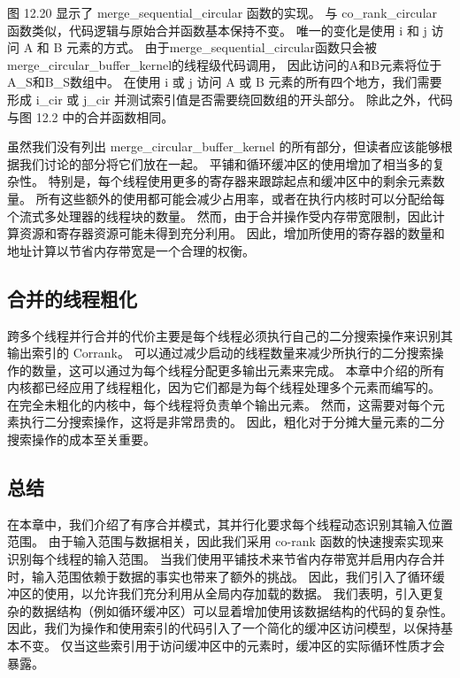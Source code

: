 图 12.20 显示了 merge\_sequential\_circular 函数的实现。 
与 co\_rank\_circular 函数类似，代码逻辑与原始合并函数基本保持不变。 
唯一的变化是使用 i 和 j 访问 A 和 B 元素的方式。 
由于merge\_sequential\_circular函数只会被merge\_circular\_buffer\_kernel的线程级代码调用，
因此访问的A和B元素将位于A\_S和B\_S数组中。 
在使用 i 或 j 访问 A 或 B 元素的所有四个地方，我们需要形成 i\_cir 或 j\_cir 并测试索引值是否需要绕回数组的开头部分。 
除此之外，代码与图 12.2 中的合并函数相同。

虽然我们没有列出 merge\_circular\_buffer\_kernel 的所有部分，但读者应该能够根据我们讨论的部分将它们放在一起。 
平铺和循环缓冲区的使用增加了相当多的复杂性。 特别是，每个线程使用更多的寄存器来跟踪起点和缓冲区中的剩余元素数量。 
所有这些额外的使用都可能会减少占用率，或者在执行内核时可以分配给每个流式多处理器的线程块的数量。 
然而，由于合并操作受内存带宽限制，因此计算资源和寄存器资源可能未得到充分利用。 
因此，增加所使用的寄存器的数量和地址计算以节省内存带宽是一个合理的权衡。

\subsection{合并的线程粗化}
跨多个线程并行合并的代价主要是每个线程必须执行自己的二分搜索操作来识别其输出索引的 Corrank。 
可以通过减少启动的线程数量来减少所执行的二分搜索操作的数量，这可以通过为每个线程分配更多输出元素来完成。 
本章中介绍的所有内核都已经应用了线程粗化，因为它们都是为每个线程处理多个元素而编写的。 
在完全未粗化的内核中，每个线程将负责单个输出元素。 然而，这需要对每个元素执行二分搜索操作，这将是非常昂贵的。 
因此，粗化对于分摊大量元素的二分搜索操作的成本至关重要。

\subsection{总结}
在本章中，我们介绍了有序合并模式，其并行化要求每个线程动态识别其输入位置范围。 
由于输入范围与数据相关，因此我们采用 co-rank 函数的快速搜索实现来识别每个线程的输入范围。 
当我们使用平铺技术来节省内存带宽并启用内存合并时，输入范围依赖于数据的事实也带来了额外的挑战。 
因此，我们引入了循环缓冲区的使用，以允许我们充分利用从全局内存加载的数据。 
我们表明，引入更复杂的数据结构（例如循环缓冲区）可以显着增加使用该数据结构的代码的复杂性。 
因此，我们为操作和使用索引的代码引入了一个简化的缓冲区访问模型，以保持基本不变。 
仅当这些索引用于访问缓冲区中的元素时，缓冲区的实际循环性质才会暴露。